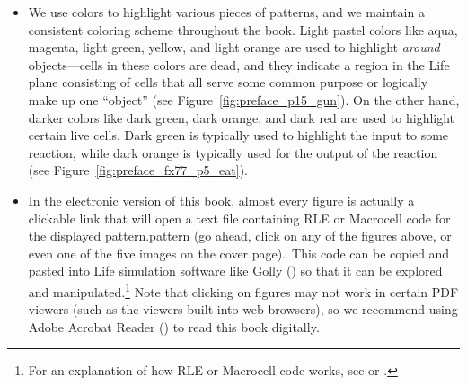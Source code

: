 \begin{itemize}
	\item We use colors to highlight various pieces of patterns, and we maintain a consistent coloring scheme throughout the book. Light pastel colors like aqua, magenta, light green, yellow, and light orange are used to highlight \emph{around} objects---cells in these colors are dead, and they indicate a region in the Life plane consisting of cells that all serve some common purpose or logically make up one ``object'' (see Figure~\ref{fig:preface_p15_gun}). On the other hand, darker colors like dark green, dark orange, and dark red are used to highlight certain live cells. Dark green is typically used to highlight the input to some reaction, while dark orange is typically used for the output of the reaction (see Figure~\ref{fig:preface_fx77_p5_eat}).\bigskip
	
	\noindent\begin{minipage}{\linewidth}
		\centering
		\begin{minipage}[b]{0.56\textwidth}
			\centering
			\label{fig:preface_p15_gun}
		\end{minipage}\hfill
		\begin{minipage}[b]{0.4\textwidth}
			\centering
			\label{fig:preface_fx77_p5_eat}
		\end{minipage}\bigskip
	\end{minipage}
	
	\item In the electronic version of this book, almost every figure is actually a clickable link that will open a text file containing RLE or Macrocell code for the displayed \ifdefined\FORPRINTING pattern.\else pattern (go ahead, click on any of the figures above, or even one of the five images on the cover page).\fi\ This code can be copied and pasted into Life simulation software like Golly () so that it can be explored and manipulated.\footnote{For an explanation of how RLE or Macrocell code works, see  or .} Note that clicking on figures may not work in certain PDF viewers (such as the viewers built into web browsers), so we recommend using Adobe Acrobat Reader () to read this book digitally.\smallskip
	

\end{itemize}
